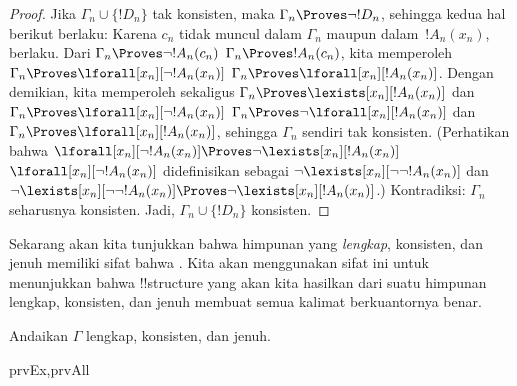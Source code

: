 \documentclass[../../../include/open-logic-section]{subfiles}
\begin{document}
\begin{proof}
Jika $\Gamma_n \cup \{!D_n\}$ tak konsisten, maka $\Gamma_n
\Proves \lnot !D_n$, sehingga kedua hal berikut berlaku:
Karena $c_n$ tidak muncul dalam
$\Gamma_n$ maupun dalam~$!A_n(x_n)$,
berlaku. Dari 
{$\Gamma_n \Proves \lnot !A_n(c_n)$}
{$\Gamma_n \Proves !A_n(c_n)$},
kita memperoleh
{$\Gamma_n \Proves \lforall[x_n][\lnot !A_n(x_n)]$}
{$\Gamma_n \Proves \lforall[x_n][!A_n(x_n)]$}.
Dengan demikian, kita memperoleh sekaligus
{$\Gamma_n \Proves \lexists[x_n][!A_n(x_n)]$ dan
$\Gamma_n \Proves \lforall[x_n][\lnot !A_n(x_n)]$}
{$\Gamma_n \Proves \lnot\lforall[x_n][!A_n(x_n)]$ dan
$\Gamma_n \Proves \lforall[x_n][!A_n(x_n)]$},
sehingga $\Gamma_n$ sendiri tak konsisten.
{(Perhatikan bahwa
{$\lforall[x_n][\lnot !A_n(x_n)] \Proves
  \lnot\lexists[x_n][!A_n(x_n)]$}
{$\lforall[x_n][\lnot !A_n(x_n)]$ didefinisikan sebagai
  $\lnot\lexists[x_n][\lnot\lnot !A_n(x_n)]$ dan
  $\lnot\lexists[x_n][\lnot\lnot !A_n(x_n)] \Proves
  \lnot\lexists[x_n][!A_n(x_n)]$}.)}{}
Kontradiksi: $\Gamma_n$ seharusnya konsisten. Jadi,
$\Gamma_n \cup \{ !D_n\}$ konsisten.
\end{proof}

\begin{explain}
Sekarang akan kita tunjukkan bahwa himpunan yang \emph{lengkap},
konsisten, dan jenuh memiliki sifat bahwa 
. Kita akan menggunakan sifat ini untuk menunjukkan
bahwa !!{structure} yang akan kita hasilkan dari suatu himpunan lengkap,
konsisten, dan jenuh membuat semua kalimat berkuantornya benar.
\end{explain}

\begin{prop}
Andaikan $\Gamma$ lengkap, konsisten, dan jenuh.
\begin{tagenumerate}{prvEx,prvAll}
\end{tagenumerate}
\end{prop}
\end{document}
